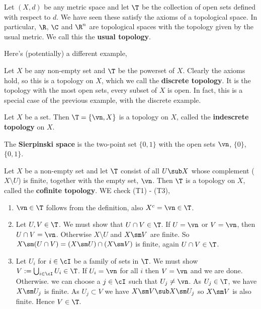 \begin{eg}
  Let $(X, d)$ be any metric space and let $\T$ be the collection of open sets defined with respect to $d$. We have seen these satisfy the axioms of a topological space. In particular, $\R$, $\C$ and $\R^n$ are topological spaces with the topology given by the usual metric. We call this the \textbf{usual topology}.
\end{eg}

\noindent
Here's (potentially) a different example,
\begin{eg}
  Let $X$ be any non-empty set and $\T$ be the powerset of $X$. Clearly the axioms hold, so this is a topology on $X$, which we call the \textbf{discrete topology}. It is the topology with the most open sets, every subset of $X$ is open. In fact, this is a special case of the previous example, with the discrete example.
\end{eg}

\begin{eg}
  Let $X$ be a set. Then $\T = \{\vn, X\}$ is a topology on $X$, called the \textbf{indescrete topology} on $X$.
\end{eg}
\begin{eg}
  The \textbf{Sierpinski space} is the two-point set $\{0, 1\}$ with the open sets $\vn$, $\{0\}$, $\{0, 1\}$.
\end{eg}
\begin{eg}
  Let $X$ be a non-empty set and let $\T$ consist of all $U \sub X$ whose complement ($X\setminus U$) is finite, together with the empty set, $\vn$. Then $\T$ is a topology on $X$, called the \textbf{cofinite topology}. WE check (T1) - (T3),
  \begin{enumerate}
    \item $\vn \in \T$ follows from the definition, also $X^c = \vn \in \T$.
    \item Let $U, V \in \T$. We must show that $U \cap V \in \T$. If $U = \vn$ or $V = \vn$, then $U \cap V = \vn$. Otherwise $X\setminus U$ and $X \sm V$ are finite. So $X\sm (U \cap V) = (X\sm U)\cap (X\sm V)$ is finite, again $U \cap V \in \T$.
    \item Let $U_i $ for $i \in \cI$ be a family of sets in $\T$. We must show $V := \bigcup_{i \in \cI} U_i \in \T$. If $U_i = \vn$ for all $i$ then $V = \vn$ and we are done. Otherwise. we can choose a $j \in \cI$ such that $U_j \ne \vn$. As $U_j \in \T$, we have $X \sm U_j$ is finite. As $U_j \subset V$ we have $X\sm V \sub X\sm U_j$ so $X\sm V$ is also finite. Hence $V \in \T$.
  \end{enumerate}
\end{eg}

